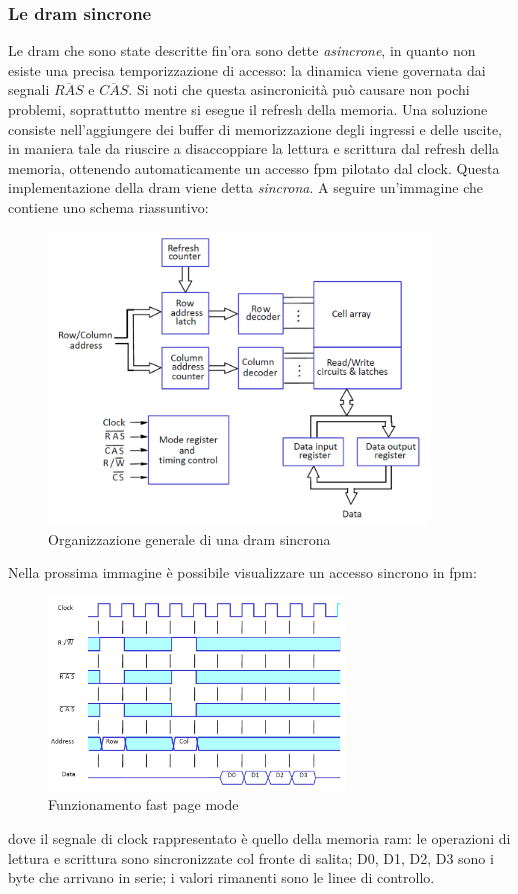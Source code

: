 \documentclass[class=book, crop=false, oneside]{standalone}
\begin{document}
\subsubsection{Le \acrshort{dram} sincrone}
Le \acrshort{dram} che sono state descritte fin'ora sono dette \emph{asincrone}, in quanto non esiste una precisa temporizzazione di accesso: la dinamica viene governata dai segnali \emph{\(\overline{RAS}\)} e \emph{\(\overline{CAS}\)}. Si noti che questa asincronicità può causare non pochi problemi, soprattutto mentre si esegue il refresh della memoria. Una soluzione consiste nell'aggiungere dei buffer di memorizzazione degli ingressi e delle uscite, in maniera tale da riuscire a disaccoppiare la lettura e scrittura dal refresh della memoria, ottenendo automaticamente un accesso \acrshort{fpm} pilotato dal clock. Questa implementazione della \acrshort{dram} viene detta \emph{sincrona}. A seguire un'immagine che contiene uno schema riassuntivo:
\begin{figure}[H]
	\centering
	\includegraphics[width=0.9\textwidth,keepaspectratio]{DRAM_sincrona.png}
	\caption{Organizzazione generale di una \acrshort{dram} sincrona}
\end{figure}

Nella prossima immagine è possibile visualizzare un accesso sincrono in \acrshort{fpm}:
\begin{figure}[H]
	\centering
	\includegraphics[width=0.7\textwidth,keepaspectratio]{FPM.png}
	\caption{Funzionamento fast page mode}
\end{figure}
dove il segnale di clock rappresentato è quello della memoria \acrshort{ram}: le operazioni di lettura e scrittura sono sincronizzate col fronte di salita; D0, D1, D2, D3 sono i byte che arrivano in serie; i valori rimanenti sono le linee di controllo.
\end{document}
